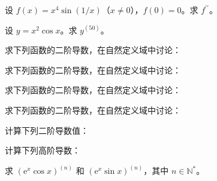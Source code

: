 \noindent\begin{minipage}{\textwidth}
设 $f(x)=x^4\sin(1/x)$（$x\ne0$），$f(0)=0$。求 $f^{\prime\prime}$。
\end{minipage}\par\vfill
\newpage
\noindent\begin{minipage}{\textwidth}
设 $y=x^2\cos x$。求 $y^{(50)}$。
\end{minipage}\par\vfill
\noindent\begin{minipage}{\textwidth}
求下列函数的二阶导数，在自然定义域中讨论：
\end{minipage}\par\vfill
\noindent\begin{minipage}{\textwidth}
求下列函数的二阶导数，在自然定义域中讨论：
\end{minipage}\par\vfill
\newpage
\noindent\begin{minipage}{\textwidth}
求下列函数的二阶导数，在自然定义域中讨论：
\end{minipage}\par\vfill
\noindent\begin{minipage}{\textwidth}
求下列函数的二阶导数，在自然定义域中讨论：
\end{minipage}\par\vfill
\noindent\begin{minipage}{\textwidth}
计算下列二阶导数值：
\end{minipage}\par\vfill
\newpage
\noindent\begin{minipage}{\textwidth}
计算下列高阶导数：
\end{minipage}\par\vfill
\noindent\begin{minipage}{\textwidth}
求 $(\mathrm e^x\cos x)^{(n)}$ 和 $(\mathrm e^x\sin x)^{(n)}$，其中 $n\in\mathbb N^*$。
\end{minipage}\par\vfill
